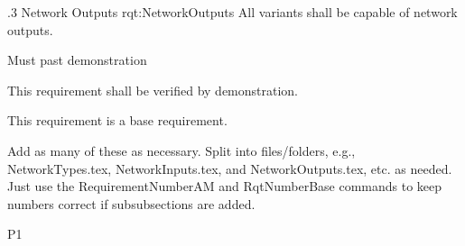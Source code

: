 \ONERQMTVKPP
{\RqtNumberBase.3}
{Network Outputs}
{rqt:NetworkOutputs}
{All \ThisSys variants shall be capable of \TBD network outputs.}
{
	\item [Phase 1] Must past demonstration
}
{This requirement shall be verified by demonstration.}
{
	\item [N/A] This requirement is a base requirement.
}
{
  \item Add as many of these as necessary.  Split into files/folders, e.g., NetworkTypes.tex, NetworkInputs.tex, and NetworkOutputs.tex, etc. as needed. Just use the RequirementNumberAM and RqtNumberBase commands to keep numbers correct if subsubsections are added.
}
{P1}

